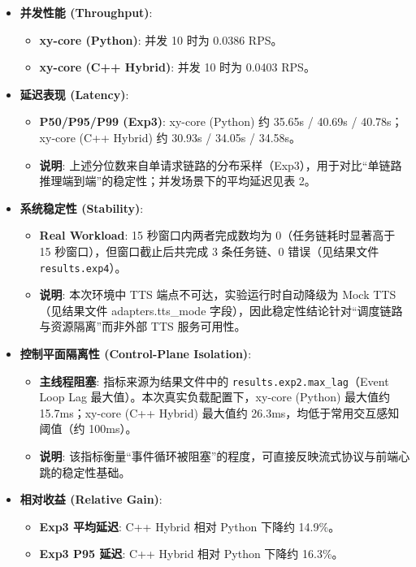 \documentclass[a4paper,12pt]{article}
\begin{document}
\begin{itemize}
    \item \textbf{并发性能 (Throughput)}:
    \begin{itemize}
        \item \textbf{xy-core (Python)}: 并发 10 时为 0.0386 RPS。
        \item \textbf{xy-core (C++ Hybrid)}: 并发 10 时为 0.0403 RPS。
    \end{itemize}

    \item \textbf{延迟表现 (Latency)}:
    \begin{itemize}
        \item \textbf{P50/P95/P99 (Exp3)}: xy-core (Python) 约 35.65s / 40.69s / 40.78s；xy-core (C++ Hybrid) 约 30.93s / 34.05s / 34.58s。
        \item \textbf{说明}: 上述分位数来自单请求链路的分布采样（Exp3），用于对比“单链路推理端到端”的稳定性；并发场景下的平均延迟见表 2。
    \end{itemize}

    \item \textbf{系统稳定性 (Stability)}:
    \begin{itemize}
        \item \textbf{Real Workload}: 15 秒窗口内两者完成数均为 0（任务链耗时显著高于 15 秒窗口），但窗口截止后共完成 3 条任务链、0 错误（见结果文件 \texttt{results.exp4}）。
        \item \textbf{说明}: 本次环境中 TTS 端点不可达，实验运行时自动降级为 Mock TTS（见结果文件 adapters.tts\_mode 字段），因此稳定性结论针对“调度链路与资源隔离”而非外部 TTS 服务可用性。
    \end{itemize}

    \item \textbf{控制平面隔离性 (Control-Plane Isolation)}:
    \begin{itemize}
        \item \textbf{主线程阻塞}: 指标来源为结果文件中的 \texttt{results.exp2.max\_lag}（Event Loop Lag 最大值）。本次真实负载配置下，xy-core (Python) 最大值约 15.7ms；xy-core (C++ Hybrid) 最大值约 26.3ms，均低于常用交互感知阈值（约 100ms）。
        \item \textbf{说明}: 该指标衡量“事件循环被阻塞”的程度，可直接反映流式协议与前端心跳的稳定性基础。
    \end{itemize}
    \item \textbf{相对收益 (Relative Gain)}:
    \begin{itemize}
        \item \textbf{Exp3 平均延迟}: C++ Hybrid 相对 Python 下降约 14.9\%。
        \item \textbf{Exp3 P95 延迟}: C++ Hybrid 相对 Python 下降约 16.3\%。
    \end{itemize}
\end{itemize}
\end{document}
